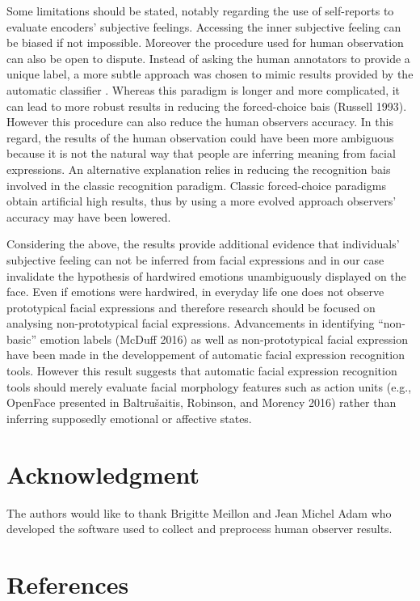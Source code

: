 \documentclass[conference,final,]{IEEEtran}
\begin{document}
Some limitations should be stated, notably regarding the use of
self-reports to evaluate encoders' subjective feelings. Accessing the
inner subjective feeling can be biased if not impossible. Moreover the
procedure used for human observation can also be open to dispute.
Instead of asking the human annotators to provide a unique label, a more
subtle approach was chosen to mimic results provided by the automatic
classifier . Whereas this paradigm is longer and more complicated, it
can lead to more robust results in reducing the forced-choice bais
(Russell 1993). However this procedure can also reduce the human
observers accuracy. In this regard, the results of the human observation
could have been more ambiguous because it is not the natural way that
people are inferring meaning from facial expressions. An alternative
explanation relies in reducing the recognition bais involved in the
classic recognition paradigm. Classic forced-choice paradigms obtain
artificial high results, thus by using a more evolved approach
observers' accuracy may have been lowered.

Considering the above, the results provide additional evidence that
individuals' subjective feeling can not be inferred from facial
expressions and in our case invalidate the hypothesis of hardwired
emotions unambiguously displayed on the face. Even if emotions were
hardwired, in everyday life one does not observe prototypical facial
expressions and therefore research should be focused on analysing
non-prototypical facial expressions. Advancements in identifying
``non-basic'' emotion labels (McDuff 2016) as well as non-prototypical
facial expression have been made in the developpement of automatic
facial expression recognition tools. However this result suggests that
automatic facial expression recognition tools should merely evaluate
facial morphology features such as action units (e.g., OpenFace
presented in Baltrušaitis, Robinson, and Morency 2016) rather than
inferring supposedly emotional or affective states.

\hypertarget{acknowledgment}{%
\section{Acknowledgment}\label{acknowledgment}}

The authors would like to thank Brigitte Meillon and Jean Michel Adam
who developed the software used to collect and preprocess human observer
results.

\hypertarget{references}{%
\section*{References}\label{references}}
\end{document}
